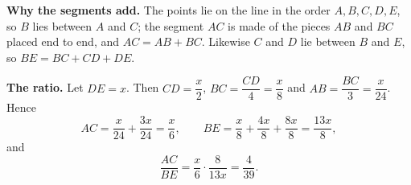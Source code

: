 \textbf{Why the segments add.} The points lie on the line in the order $A,B,C,D,E$, so $B$ lies between $A$ and $C$; the segment $AC$ is made of the pieces $AB$ and $BC$ placed end to end, and $AC=AB+BC$. Likewise $C$ and $D$ lie between $B$ and $E$, so $BE=BC+CD+DE$.

\textbf{The ratio.} Let $DE=x$. Then $CD=\dfrac {x}{2}$, $BC=\dfrac{CD}{4}=\dfrac {x}{8}$ and $AB=\dfrac{BC}{3}=\dfrac {x}{24}$. Hence
\[
AC=\dfrac{x}{24}+\dfrac{3x}{24}=\dfrac{x}{6},\qquad BE=\dfrac {x}{8}+\dfrac{4x}{8}+\dfrac{8x}{8}=\dfrac{13x}{8},
\]
and
\[
\dfrac{AC}{BE}=\dfrac{x}{6}\cdot\dfrac{8}{13x}=\boxed{\dfrac{4}{39}}.
\]
